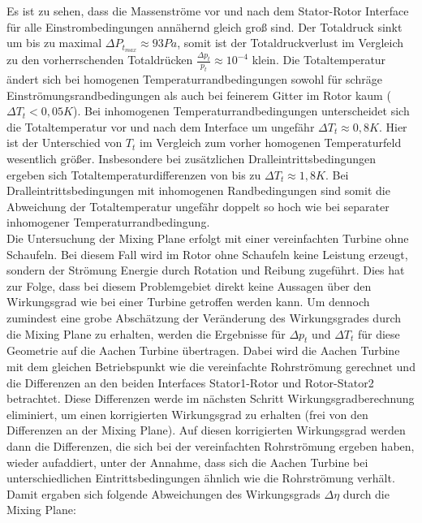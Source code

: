 Es ist zu sehen, dass die Massenströme vor und nach dem Stator-Rotor Interface für alle Einstrombedingungen annähernd gleich groß sind. Der Totaldruck sinkt um bis zu maximal $\Delta P_{t_{max}} \approx 93 Pa$, somit ist der Totaldruckverlust im Vergleich zu den vorherrschenden Totaldrücken $\frac{\Delta p_t}{p_t} \approx 10^{-4}$ klein. \newline Die Totaltemperatur ändert sich bei homogenen Temperaturrandbedingungen sowohl für schräge Einströmungsrandbedingungen als auch bei feinerem Gitter im Rotor kaum ($\Delta T_t < 0,05 K$). \newline
Bei inhomogenen Temperaturrandbedingungen unterscheidet sich die Totaltemperatur vor und nach dem Interface um ungefähr $\Delta T_t \approx 0,8K$. Hier ist der Unterschied von $T_t$ im Vergleich zum vorher homogenen Temperaturfeld wesentlich größer. Insbesondere bei zusätzlichen Dralleintrittsbedingungen ergeben sich Totaltemperaturdifferenzen von bis zu $\Delta T_t \approx 1,8K$. Bei Dralleintrittsbedingungen mit inhomogenen Randbedingungen sind somit die Abweichung der Totaltemperatur ungefähr doppelt so hoch wie bei separater inhomogener Temperaturrandbedingung.\\
Die Untersuchung der Mixing Plane erfolgt mit einer vereinfachten Turbine ohne Schaufeln. Bei diesem Fall wird im Rotor ohne Schaufeln keine Leistung erzeugt, sondern der Strömung Energie durch Rotation und Reibung zugeführt. Dies hat zur Folge, dass bei diesem Problemgebiet direkt keine Aussagen über den Wirkungsgrad wie bei einer Turbine getroffen werden kann. Um dennoch zumindest eine grobe Abschätzung der Veränderung des Wirkungsgrades durch die Mixing Plane zu erhalten, werden die Ergebnisse für $\Delta p_t$ und $\Delta T_t$ für diese Geometrie auf die Aachen Turbine übertragen. Dabei wird die Aachen Turbine mit dem gleichen Betriebspunkt wie die vereinfachte Rohrströmung gerechnet und die Differenzen an den beiden Interfaces Stator1-Rotor und Rotor-Stator2 betrachtet. Diese Differenzen werde im nächsten Schritt Wirkungsgradberechnung eliminiert, um einen korrigierten Wirkungsgrad zu erhalten (frei von den Differenzen an der Mixing Plane). Auf diesen korrigierten Wirkungsgrad werden dann die Differenzen, die sich bei der vereinfachten Rohrströmung ergeben haben, wieder aufaddiert, unter der Annahme, dass sich die Aachen Turbine bei unterschiedlichen Eintrittsbedingungen ähnlich wie die Rohrströmung verhält. Damit ergaben sich folgende Abweichungen des Wirkungsgrads $\Delta \eta$ durch die Mixing Plane:
